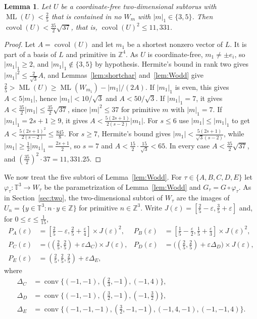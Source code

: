 \documentclass[12pt]{amsart}
\newtheorem{lemma}[theorem]{Lemma}
\theoremstyle{definition}\newtheorem{definition}[theorem]{Definition}
\theoremstyle{remark}\newtheorem{remark}[theorem]{Remark}
\newcommand{\Z}{\mathbb Z}\newcommand{\R}{\mathbb R}\newcommand{\T}{\mathbb T}
\newcommand{\ML}{\operatorname{ML}}
\newcommand{\covol}{\operatorname{covol}}
\newcommand{\eucl}[1]{\lvert #1\rvert}
\begin{document}
\begin{lemma}\label{lem:generic25}
Let $U$ be a coordinate-free two-dimensional subtorus with $\ML(U)<\frac25$ that is contained in no $W_m$ with $|m|_1\in\{3,5\}$. Then $\covol(U)<\frac{35}2\sqrt{37}$, that is, $\covol(U)^2\le11{,}331$.
\end{lemma}
\begin{proof}
Let $A=\covol(U)$ and let $m_1$ be a shortest nonzero vector of $L$. It is part of a basis of $L$ and primitive in $\Z^4$. As $U$ is coordinate-free, $m_1\ne\pm e_i$, so $|m_1|_1\ge2$, and $|m_1|_1\notin\{3,5\}$ by hypothesis. Hermite's bound in rank two gives $\eucl{m_1}^2\le\frac2{\sqrt3}A$, and Lemmas~\ref{lem:shortchar} and~\ref{lem:Wodd} give $\frac25>\ML(U)\ge\ML(W_{m_1})-\eucl{m_1}/(2A)$. If $|m_1|_1$ is even, this gives $A<5\eucl{m_1}$, hence $\eucl{m_1}<10/\sqrt3$ and $A<50/\sqrt3$. If $|m_1|_1=7$, it gives $A<\frac{35}2\eucl{m_1}\le\frac{35}2\sqrt{37}$, since $\eucl m^2\le37$ for primitive $m$ with $|m|_1=7$. If $|m_1|_1=2s+1\ge9$, it gives $A<\frac{5(2s+1)}{2(s-2)}\eucl{m_1}$. For $s\le6$ use $\eucl{m_1}\le|m_1|_1$ to get $A<\frac{5(2s+1)^2}{2(s-2)}\le\frac{845}8$. For $s\ge7$, Hermite's bound gives $\eucl{m_1}<\frac{5(2s+1)}{\sqrt3(s-2)}$, while $\eucl{m_1}\ge\frac12|m_1|_1=\frac{2s+1}2$, so $s=7$ and $A<\frac{15}2\cdot\frac{15}{\sqrt3}<65$. In every case $A<\frac{35}2\sqrt{37}$, and $(\frac{35}2)^2\cdot37=11{,}331.25$.
\end{proof}

We now treat the five subtori of Lemma~\ref{lem:Wodd}. For $\tau\in\{A,B,C,D,E\}$ let $\varphi_\tau:\T^3\to W_\tau$ be the parametrization of Lemma~\ref{lem:Wodd} and $G_\tau=G\circ\varphi_\tau$. As in Section~\ref{sec:two}, the two-dimensional subtori of $W_\tau$ are the images of $U_n=\{y\in\T^3:n\cdot y\in\Z\}$ for primitive $n\in\Z^3$. Write $J(\varepsilon)=[\frac25-\varepsilon,\frac35+\varepsilon]$ and, for $0\le\varepsilon\le\frac1{15}$,
\begin{align*}
 P_A(\varepsilon)&=[\tfrac25-\varepsilon,\tfrac25+\tfrac\varepsilon4]\times J(\varepsilon)^2, & P_B(\varepsilon)&=[\tfrac15-\tfrac\varepsilon2,\tfrac15+\tfrac\varepsilon3]\times J(\varepsilon)^2,\\
 P_C(\varepsilon)&=\big((\tfrac25,\tfrac25)+\varepsilon\Delta_C\big)\times J(\varepsilon), & P_D(\varepsilon)&=\big((\tfrac25,\tfrac25)+\varepsilon\Delta_D\big)\times J(\varepsilon),\\
 P_E(\varepsilon)&=(\tfrac25,\tfrac25,\tfrac25)+\varepsilon\Delta_E,
\end{align*}
where
\begin{align*}
 \Delta_C&=\operatorname{conv}\{(-1,-1),(\tfrac23,-1),(-1,4)\},\\
 \Delta_D&=\operatorname{conv}\{(-1,-1),(\tfrac32,-1),(-1,\tfrac32)\},\\
 \Delta_E&=\operatorname{conv}\{(-1,-1,-1),(\tfrac32,-1,-1),(-1,4,-1),(-1,-1,4)\}.
\end{align*}
\end{document}
